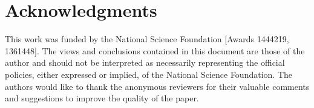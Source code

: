 \documentclass[11pt]{article}\topmargin 0mm
\begin{document}
\section{Acknowledgments}
This work was funded by the National Science Foundation [Awards
1444219, 1361448]. The views and conclusions contained in this
document are those of the author and should not be interpreted
as necessarily representing the official policies, either
expressed or implied, of the National Science Foundation. The authors would like to thank the anonymous reviewers for their valuable comments and suggestions to improve the quality of the paper.





%
\end{document}
